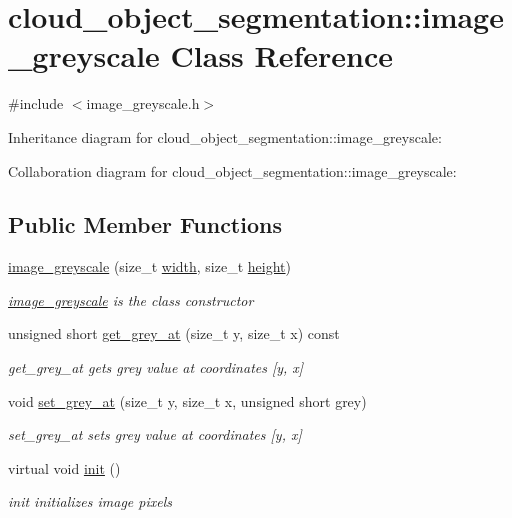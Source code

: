 \hypertarget{classcloud__object__segmentation_1_1image__greyscale}{}\section{cloud\+\_\+object\+\_\+segmentation\+:\+:image\+\_\+greyscale Class Reference}
\label{classcloud__object__segmentation_1_1image__greyscale}


{\ttfamily \#include $<$image\+\_\+greyscale.\+h$>$}



Inheritance diagram for cloud\+\_\+object\+\_\+segmentation\+:\+:image\+\_\+greyscale\+:


Collaboration diagram for cloud\+\_\+object\+\_\+segmentation\+:\+:image\+\_\+greyscale\+:
\subsection*{Public Member Functions}
\begin{DoxyCompactItemize}
\item 
\hyperlink{classcloud__object__segmentation_1_1image__greyscale_a70a894a989e9e5bbd67b1b2ab64fc277}{image\+\_\+greyscale} (size\+\_\+t \hyperlink{classcloud__object__segmentation_1_1image_ac46913c2b63ca4d8e60f267a374429be}{width}, size\+\_\+t \hyperlink{classcloud__object__segmentation_1_1image_ad0e1ec069c7c5f8cde4cc1cd3f86ad1c}{height})
\begin{DoxyCompactList}\small\item\em \hyperlink{classcloud__object__segmentation_1_1image__greyscale}{image\+\_\+greyscale} is the class constructor \end{DoxyCompactList}\item 
unsigned short \hyperlink{classcloud__object__segmentation_1_1image__greyscale_a3d9e6b7a02e6eedd97c4c93f4247cf12}{get\+\_\+grey\+\_\+at} (size\+\_\+t y, size\+\_\+t x) const 
\begin{DoxyCompactList}\small\item\em get\+\_\+grey\+\_\+at gets grey value at coordinates \mbox{[}y, x\mbox{]} \end{DoxyCompactList}\item 
void \hyperlink{classcloud__object__segmentation_1_1image__greyscale_abbfb120919542e3bb2f446c4c87a2f66}{set\+\_\+grey\+\_\+at} (size\+\_\+t y, size\+\_\+t x, unsigned short grey)
\begin{DoxyCompactList}\small\item\em set\+\_\+grey\+\_\+at sets grey value at coordinates \mbox{[}y, x\mbox{]} \end{DoxyCompactList}\item 
virtual void \hyperlink{classcloud__object__segmentation_1_1image__greyscale_a1c539ba8a0d1fb71c415cc07a701ca2b}{init} ()
\begin{DoxyCompactList}\small\item\em init initializes image pixels \end{DoxyCompactList}\end{DoxyCompactItemize}


